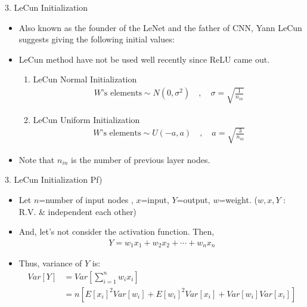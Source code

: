 \documentclass{beamer}
\begin{document}
	\begin{frame}{3. LeCun Initialization}
		\begin{itemize}
			\item Also known as the founder of the LeNet and the father of CNN, Yann LeCun suggests giving the following initial values:
			\item LeCun method\cite{lecun} have not be used well recently since ReLU came out.
			\vspace{10pt}
			\begin{enumerate}
				\vspace{3pt}
				\item LeCun Normal Initialization
				\begin{gather*}
					W\text{'s elements} \sim N(0,\sigma^2) \quad , \quad \sigma = \sqrt{\frac{1}{n_{in}}}  
				\end{gather*}
				\vspace{3pt}
				\item LeCun Uniform Initialization
				\begin{gather*}
					W\text{'s elements} \sim U(-a,a) \quad , \quad a = \sqrt{\frac{3}{n_{in}}}  
				\end{gather*}
				\vspace{3pt}
			\end{enumerate}	
			\item Note that $n_{in}$ is the number of previous layer nodes.
		\end{itemize}
	\end{frame}	


	\begin{frame}{3. LeCun Initialization}
		Pf)
		\begin{itemize}
		\item Let $n$=number of input nodes , $x$=input, $Y$=output, $w$=weight. ($w,x,Y$ : R.V. \& independent each other) 
		\item And, let's not consider the activation function. Then,
		\begin{gather*}
			Y = w_1 x_1 + w_2 x_2 + \cdots + w_n x_n
		\end{gather*}
		\item Thus, variance of $Y$ is:
		\begin{align*}
			Var[Y] &= Var[\sum_{i=1}^{n}{w_i x_i}] \\ &= n\left[ E[x_i]^2Var[w_i]+E[w_i]^2 Var[x_i] + Var[w_i]Var[x_i] \right]
		\end{align*}
		\end{itemize}
	\end{frame}	
\end{document}
